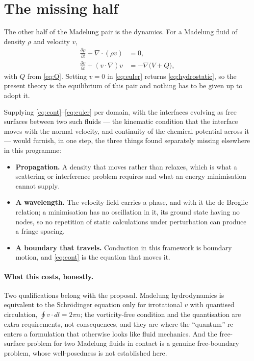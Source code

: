 \documentclass[11pt]{article}
\newcommand{\grad}{\nabla}
\begin{document}
\section{The missing half}

The other half of the Madelung pair is the dynamics. For a Madelung fluid of density $\rho$ and
velocity $v$,
\begin{align}
\frac{\partial\rho}{\partial t}+\grad\!\cdot(\rho v)&=0,\label{eq:cont}\\
\frac{\partial v}{\partial t}+(v\cdot\grad)v&=-\grad\bigl(V+Q\bigr),\label{eq:euler}
\end{align}
with $Q$ from \eqref{eq:Q}. Setting $v=0$ in \eqref{eq:euler} returns \eqref{eq:hydrostatic}, so the
present theory is the equilibrium of this pair and nothing has to be given up to adopt it.

Supplying \eqref{eq:cont}--\eqref{eq:euler} per domain, with the interfaces evolving as free surfaces
between two such fluids --- the kinematic condition that the interface moves with the normal velocity,
and continuity of the chemical potential across it --- would furnish, in one step, the three things
found separately missing elsewhere in this programme:

\begin{itemize}
\item \textbf{Propagation.} A density that moves rather than relaxes, which is what a scattering or
interference problem requires and what an energy minimisation cannot supply.
\item \textbf{A wavelength.} The velocity field carries a phase, and with it the de Broglie relation;
a minimisation has no oscillation in it, its ground state having no nodes, so no repetition of static
calculations under perturbation can produce a fringe spacing.
\item \textbf{A boundary that travels.} Conduction in this framework is boundary motion, and
\eqref{eq:cont} is the equation that moves it.
\end{itemize}

\paragraph{What this costs, honestly.} Two qualifications belong with the proposal. Madelung
hydrodynamics is equivalent to the Schr\"odinger equation only for irrotational $v$ with quantised
circulation, $\oint v\cdot dl=2\pi n$; the vorticity-free condition and the quantisation are extra
requirements, not consequences, and they are where the ``quantum'' re-enters a formulation that
otherwise looks like fluid mechanics. And the free-surface problem for two Madelung fluids in contact
is a genuine free-boundary problem, whose well-posedness is not established here.
\end{document}
